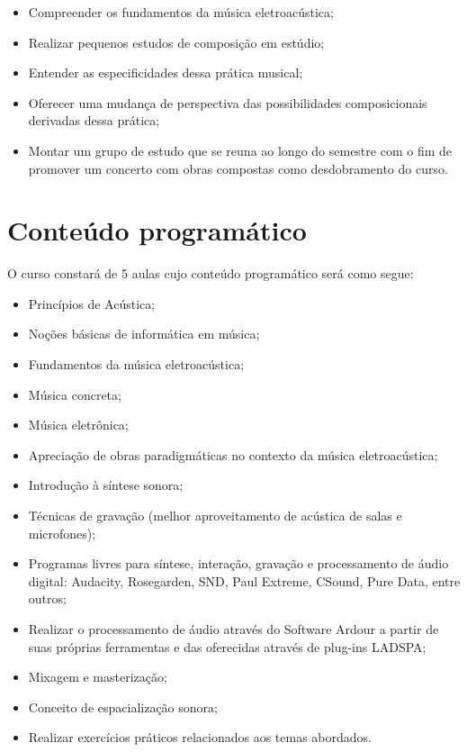 \documentclass[12pt]{article}
\begin{document}
\begin{itemize}
\item Compreender os fundamentos da música eletroacústica;
\item Realizar pequenos estudos de composição em estúdio;
\item Entender as especificidades dessa prática musical;
\item Oferecer uma mudança de perspectiva das possibilidades
  composicionais derivadas dessa prática;
\item Montar um grupo de estudo que se reuna ao longo do semestre com
  o fim de promover um concerto com obras compostas como desdobramento
  do curso.
\end{itemize}

\section{Conteúdo programático}

O curso constará de 5 aulas cujo conteúdo programático será como
segue:

\begin{itemize}
\item Princípios de Acústica;
\item Noções básicas de informática em música;
\item Fundamentos da música eletroacústica;
\item Música concreta;
\item Música eletrônica;
\item Apreciação de obras paradigmáticas no contexto da música
  eletroacústica;
\item Introdução à síntese sonora;
\item Técnicas de gravação (melhor aproveitamento de acústica de salas e microfones);
\item Programas livres para síntese, interação, gravação e
  processamento de áudio digital: Audacity, Rosegarden, SND, Paul
  Extreme, CSound, Pure Data, entre outros;
\item Realizar o processamento de áudio através do Software Ardour a
  partir de suas próprias ferramentas e das oferecidas através de
  plug-ins LADSPA;
\item Mixagem e masterização;
\item Conceito de espacialização sonora;
\item Realizar exercícios práticos relacionados aos temas abordados.
\end{itemize}
\end{document}
